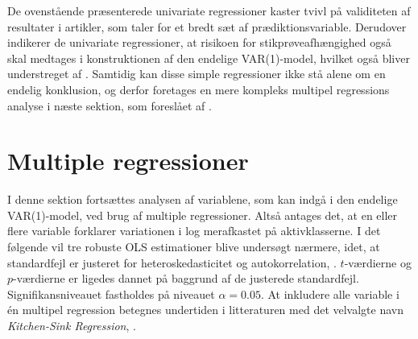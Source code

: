 \documentclass[
  a4paper,
  oneside]{memoir}
\begin{document}
\begin{table}[!h]
\begin{threeparttable}
\begin{tablenotes}
\end{tablenotes}
\end{threeparttable}
\end{table}

De ovenstående præsenterede univariate regressioner kaster tvivl på validiteten af resultater i artikler, som taler for et bredt sæt af prædiktionsvariable. Derudover indikerer de univariate regressioner, at risikoen for stikprøveafhængighed også skal medtages i konstruktionen af den endelige VAR(1)-model, hvilket også bliver understreget af \citep{Goyal2007}. Samtidig kan disse simple regressioner ikke stå alene om en endelig konklusion, og derfor foretages en mere kompleks multipel regressions analyse i næste sektion, som foreslået af \citep{Goyal2007}.

\hypertarget{multreg}{%
\section{Multiple regressioner}\label{multreg}}

I denne sektion fortsættes analysen af variablene, som kan indgå i den endelige VAR(1)-model, ved brug af multiple regressioner. Altså antages det, at en eller flere variable forklarer variationen i log merafkastet på aktivklasserne. I det følgende vil tre robuste OLS estimationer blive undersøgt nærmere, idet, at standardfejl er justeret for heteroskedasticitet og autokorrelation, \citep{Newey1987}. \(t\)-værdierne og \(p\)-værdierne er ligedes dannet på baggrund af de justerede standardfejl. Signifikansniveauet fastholdes på niveauet \(\alpha=0.05\). At inkludere alle variable i én multipel regression betegnes undertiden i litteraturen med det velvalgte navn \emph{Kitchen-Sink Regression}, \citep{Goyal2007}.
\end{document}
